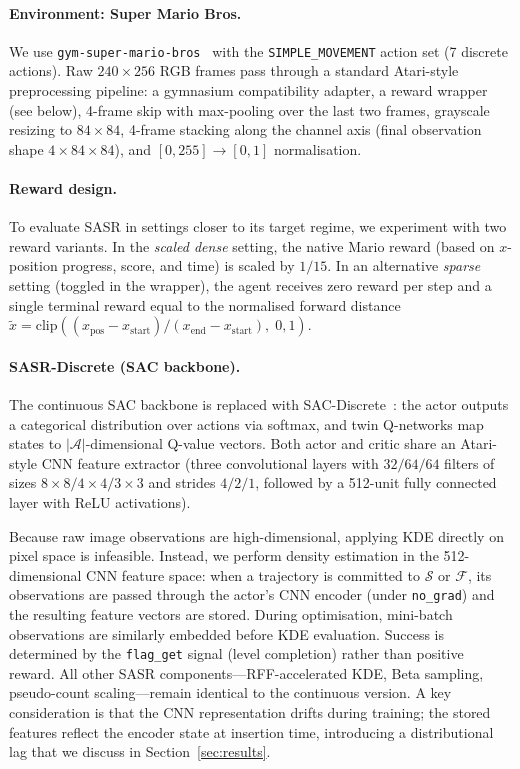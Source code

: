 \documentclass{article}
\begin{document}
\paragraph{Environment: Super Mario Bros.}
We use \texttt{gym-super-mario-bros}~\citep{gym-super-mario-bros} with the \texttt{SIMPLE\_MOVEMENT} action set (7 discrete actions). Raw $240 \times 256$ RGB frames pass through a standard Atari-style preprocessing pipeline: a gymnasium compatibility adapter, a reward wrapper (see below), 4-frame skip with max-pooling over the last two frames, grayscale resizing to $84 \times 84$, 4-frame stacking along the channel axis (final observation shape $4 \times 84 \times 84$), and $[0, 255] \to [0, 1]$ normalisation.

\paragraph{Reward design.}
To evaluate SASR in settings closer to its target regime, we experiment with two reward variants. In the \emph{scaled dense} setting, the native Mario reward (based on $x$-position progress, score, and time) is scaled by $1/15$. In an alternative \emph{sparse} setting (toggled in the wrapper), the agent receives zero reward per step and a single terminal reward equal to the normalised forward distance $\tilde{x} = \mathrm{clip}((x_\text{pos} - x_\text{start}) / (x_\text{end} - x_\text{start}),\; 0, 1)$.

\paragraph{SASR-Discrete (SAC backbone).}
The continuous SAC backbone is replaced with SAC-Discrete~\citep{haarnoja2018sac}: the actor outputs a categorical distribution over actions via softmax, and twin Q-networks map states to $|\mathcal{A}|$-dimensional Q-value vectors. Both actor and critic share an Atari-style CNN feature extractor (three convolutional layers with $32/64/64$ filters of sizes $8 \times 8 / 4 \times 4 / 3 \times 3$ and strides $4/2/1$, followed by a 512-unit fully connected layer with ReLU activations).

Because raw image observations are high-dimensional, applying KDE directly on pixel space is infeasible. Instead, we perform density estimation in the 512-dimensional CNN feature space: when a trajectory is committed to $\mathcal{S}$ or $\mathcal{F}$, its observations are passed through the actor's CNN encoder (under \texttt{no\_grad}) and the resulting feature vectors are stored. During optimisation, mini-batch observations are similarly embedded before KDE evaluation. Success is determined by the \texttt{flag\_get} signal (level completion) rather than positive reward. All other SASR components---RFF-accelerated KDE, Beta sampling, pseudo-count scaling---remain identical to the continuous version. A key consideration is that the CNN representation drifts during training; the stored features reflect the encoder state at insertion time, introducing a distributional lag that we discuss in Section~\ref{sec:results}.
\end{document}

